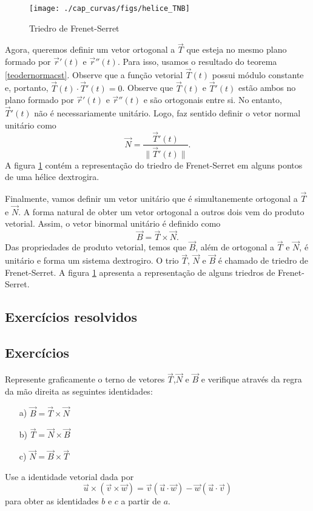\begin{figure}%
\begin{center}
    \texttt{[image: ./cap\_curvas/figs/helice\_TNB]}
\caption{Triedro de Frenet-Serret}\label{Frenet_Serret}
  \end{center}
\end{figure}


Agora, queremos definir um vetor ortogonal a $\vec{T}$ que esteja no mesmo plano formado por $\vec{r}'(t)$ e $\vec{r}''(t)$. Para isso, usamos o resultado do teorema \ref{teodernormacst}. Observe que a função vetorial $\vec{T}(t)$ possui módulo constante e, portanto, $\vec{T}(t)\cdot \vec{T}'(t)=0$. Observe que $\vec{T}(t)$ e $\vec{T}'(t)$ estão ambos no plano formado por $\vec{r}'(t)$ e $\vec{r}''(t)$ e são ortogonais entre si. No entanto, $\vec{T}'(t)$ não é necessariamente unitário. Logo, faz sentido definir o vetor normal unitário como
$$
\vec{N}=\frac{\vec{T}'(t)}{\|\vec{T}'(t)\|}.
$$
A figura \ref{Frenet_Serret} contém a representação do triedro de Frenet-Serret em alguns pontos de uma hélice dextrogira.

Finalmente, vamos definir um vetor unitário que é simultanemente ortogonal a $\vec{T}$ e $\vec{N}$. A forma natural de obter um vetor ortogonal a outros dois vem do produto vetorial. Assim, o vetor binormal unitário é definido como
$$
\vec{B}=\vec{T}\times\vec{N}.
$$
Das propriedades de produto vetorial, temos que $\vec{B}$, além de ortogonal a $\vec{T}$ e $\vec{N}$, é unitário e forma um sistema dextrogiro. O trio $\vec{T}$, $\vec{N}$ e $\vec{B}$ é chamado de triedro de Frenet-Serret. A figura \ref{Frenet_Serret} apresenta a representação de alguns triedros de Frenet-Serret.


\subsection*{Exercícios resolvidos}

\construirExeresol


\subsection*{Exercícios}

\begin{exer} Represente graficamente o terno de vetores $\vec{T}$,$\vec{N}$ e $\vec{B}$ e verifique através da regra da mão direita as seguintes identidades:
\begin{itemize}
\item[a)]$\vec{B}=\vec{T}\times\vec{N}$
\item[b)]$\vec{T}=\vec{N}\times\vec{B}$
\item[c)]$\vec{N}=\vec{B}\times\vec{T}$
\end{itemize}
Use a identidade vetorial dada por
$$\vec{u}\times\left(\vec{v}\times\vec{w}\right)=\vec{v}\left(\vec{u}\cdot\vec{w}\right)-\vec{w}\left(\vec{u}\cdot\vec{v}\right)$$ para obter as identidades $b$ e $c$ a partir de $a$.
\end{exer}


